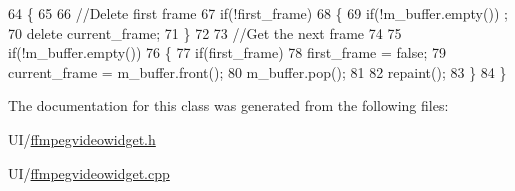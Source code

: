 \begin{DoxyCode}
64 \{
65 
66     \textcolor{comment}{//Delete first frame}
67     \textcolor{keywordflow}{if}(!first\_frame)
68     \{
69         \textcolor{keywordflow}{if}(!m\_buffer.empty()) ;
70             \textcolor{keyword}{delete} current\_frame;
71     \}
72 
73     \textcolor{comment}{//Get the next frame}
74 
75     \textcolor{keywordflow}{if}(!m\_buffer.empty())
76     \{
77         \textcolor{keywordflow}{if}(first\_frame)
78             first\_frame = \textcolor{keyword}{false};
79         current\_frame = m\_buffer.front();
80         m\_buffer.pop();
81 
82         repaint();
83     \}
84 \}
\end{DoxyCode}


The documentation for this class was generated from the following files\-:\begin{DoxyCompactItemize}
\item 
U\-I/\hyperlink{ffmpegvideowidget_8h}{ffmpegvideowidget.\-h}\item 
U\-I/\hyperlink{ffmpegvideowidget_8cpp}{ffmpegvideowidget.\-cpp}\end{DoxyCompactItemize}
